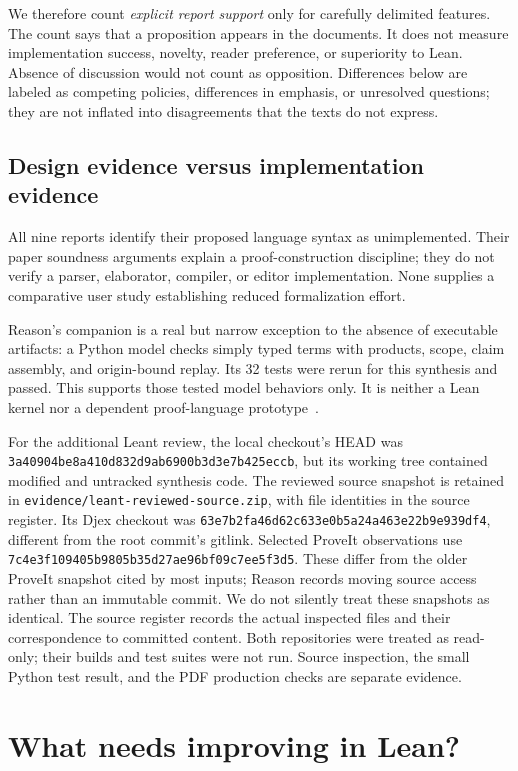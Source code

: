 \documentclass[11pt,letterpaper]{article}
\newcommand{\code}[1]{\nolinkurl{#1}}
\begin{document}
We therefore count \emph{explicit report support} only for carefully delimited
features. The count says that a proposition appears in the documents. It does not
measure implementation success, novelty, reader preference, or superiority to Lean.
Absence of discussion would not count as opposition. Differences below are labeled
as competing policies, differences in emphasis, or unresolved questions; they are
not inflated into disagreements that the texts do not express.

\subsection{Design evidence versus implementation evidence}
All nine reports identify their proposed language syntax as unimplemented. Their
paper soundness arguments explain a proof-construction discipline; they do not
verify a parser, elaborator, compiler, or editor implementation. None supplies a
comparative user study establishing reduced formalization effort.

Reason's companion is a real but narrow exception to the absence of executable
artifacts: a Python model checks simply typed terms with products, scope,
claim assembly, and origin-bound replay. Its 32 tests were rerun for this synthesis
and passed. This supports those tested model behaviors only. It is neither a Lean
kernel nor a dependent proof-language prototype~\cite[\S18]{reason}.

For the additional Leant review, the local checkout's HEAD was
\code{3a40904be8a410d832d9ab6900b3d3e7b425eccb}, but its working tree contained
modified and untracked synthesis code. The reviewed source snapshot is retained
in \code{evidence/leant-reviewed-source.zip}, with file identities in the source
register. Its Djex checkout was \code{63e7b2fa46d62c633e0b5a24a463e22b9e939df4},
different from the root commit's gitlink. Selected ProveIt observations use
\code{7c4e3f109405b9805b35d27ae96bf09c7ee5f3d5}. These differ from the older ProveIt
snapshot cited by most inputs; Reason records moving source access rather than
an immutable commit. We do not silently treat these snapshots as identical.
The source register records the actual inspected files and their correspondence
to committed content. Both repositories were treated as read-only; their builds
and test suites were not run. Source inspection, the small Python test result,
and the PDF production checks are separate evidence.

\section{What needs improving in Lean?}\label{sec:diagnosis}
\end{document}
